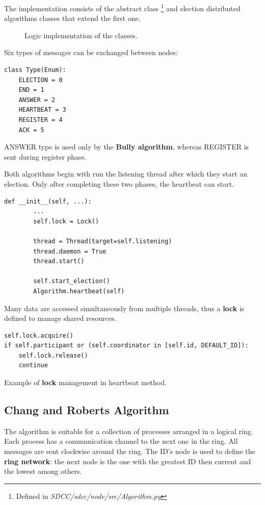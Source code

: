 \documentclass[conference]{IEEEtran}
\begin{document}
The implementation consists of the abstract class \footnote{Defined in \textit{SDCC/sdcc/node/src/Algorithm.py}} and election distributed algorithms classes that extend the first one. 

\begin{figure}[htbp]
  \centering
  
  \caption{Logic implementation of the classes.}
\end{figure}

Six types of messages can be exchanged between nodes:

\begin{lstlisting}
class Type(Enum):
    ELECTION = 0
    END = 1
    ANSWER = 2
    HEARTBEAT = 3
    REGISTER = 4
    ACK = 5
\end{lstlisting}
ANSWER type is used only by the \textbf{Bully algorithm}, whereas REGISTER is sent during register phase.

Both algorithms begin with run the listening thread after which they start an election. Only after completing these two phases, the heartbeat can start. 
\begin{lstlisting}
def __init__(self, ...):
        ...
        self.lock = Lock()
        
        thread = Thread(target=self.listening)
        thread.daemon = True
        thread.start()

        self.start_election()
        Algorithm.heartbeat(self)
\end{lstlisting}
Many data are accessed simultaneously from multiple threads, thus a \textbf{lock} is defined to manage shared resources.
\begin{lstlisting}
self.lock.acquire()
if self.participant or (self.coordinator in [self.id, DEFAULT_ID]):
    self.lock.release()
    continue
\end{lstlisting}\caption{Example of \textbf{lock} management in heartbeat method.}

\subsection{Chang and Roberts Algorithm}\label{ring}

The algorithm is suitable for a collection of processes arranged in a logical ring. Each process has a
communication channel to the next one in the ring. All messages
are sent clockwise around the ring. The ID's node is used to define the \textbf{ring network}: the next node is the one with the greatest ID then current and the lowest among others.
\end{document}
